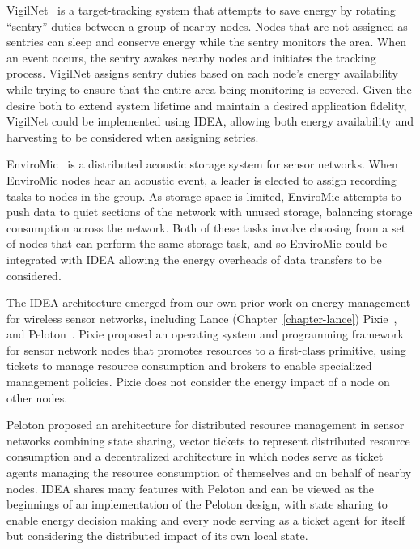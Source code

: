 VigilNet~\cite{vigilnet} is a target-tracking system that attempts to save
energy by rotating ``sentry'' duties between a group of nearby nodes. Nodes
that are not assigned as sentries can sleep and conserve energy while the
sentry monitors the area. When an event occurs, the sentry awakes nearby
nodes and initiates the tracking process. VigilNet assigns sentry duties
based on each node's energy availability while trying to ensure that the
entire area being monitoring is covered. Given the desire both to extend
system lifetime and maintain a desired application fidelity, VigilNet could
be implemented using IDEA, allowing both energy availability and harvesting
to be considered when assigning setries.

EnviroMic~\cite{enviromic} is a distributed acoustic storage system for
sensor networks. When EnviroMic nodes hear an acoustic event, a leader is
elected to assign recording tasks to nodes in the group. As storage space is
limited, EnviroMic attempts to push data to quiet sections of the network
with unused storage, balancing storage consumption across the network. Both
of these tasks involve choosing from a set of nodes that can perform the same
storage task, and so EnviroMic could be integrated with IDEA allowing the
energy overheads of data transfers to be considered.

The IDEA architecture emerged from our own prior work on energy management
for wireless sensor networks, including Lance (Chapter~\ref{chapter-lance})
Pixie~\cite{pixie-sensys08}, and Peloton~\cite{peloton-hotos09}. Pixie
proposed an operating system and programming framework for sensor network
nodes that promotes resources to a first-class primitive, using tickets to
manage resource consumption and brokers to enable specialized management
policies. Pixie does not consider the energy impact of a node on other nodes.

Peloton proposed an architecture for distributed resource management in
sensor networks combining state sharing, vector tickets to represent
distributed resource consumption and a decentralized architecture in which
nodes serve as ticket agents managing the resource consumption of themselves
and on behalf of nearby nodes. IDEA shares many features with Peloton and can
be viewed as the beginnings of an implementation of the Peloton design, with
state sharing to enable energy decision making and every node serving as a
ticket agent for itself but considering the distributed impact of its own
local state.
